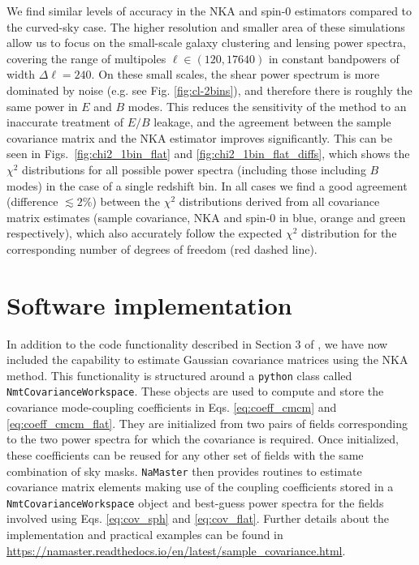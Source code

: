 \documentclass[a4paper,11pt]{article}
\begin{document}
    We find similar levels of accuracy in the NKA and spin-0 estimators
    compared to the curved-sky case. The higher resolution and smaller area of
    these simulations allow us to focus on the small-scale galaxy clustering
    and lensing power spectra, covering the range of multipoles
    $\ell\in(120,17640)$ in constant bandpowers of width $\Delta \ell=240$. On
    these small scales, the shear power spectrum is more dominated by noise
    (e.g. see Fig. \ref{fig:cl-2bins}), and therefore there is roughly the
    same power in $E$ and $B$ modes. This reduces the sensitivity of the
    method to an inaccurate treatment of $E/B$ leakage, and the agreement
    between the sample covariance matrix and the NKA estimator improves
    significantly. This can be seen in Figs.~\ref{fig:chi2_1bin_flat} and
    \ref{fig:chi2_1bin_flat_diffs}, which
    shows the $\chi^2$ distributions for all possible power spectra (including
    those including $B$ modes) in the case of a single redshift bin. In all
    cases we find a good agreement (difference $\lesssim 2 \%$) between the
    $\chi^2$ distributions derived from all covariance matrix estimates
    (sample covariance, NKA and spin-0 in blue, orange and green
    respectively), which also accurately follow the expected $\chi^2$
    distribution for the corresponding number of degrees of freedom (red
    dashed line).     
  \section{Software implementation}\label{app:namaster}
    In addition to the code functionality described in Section 3 of \cite{2019MNRAS.484.4127A}, we have now included the capability to estimate Gaussian covariance matrices using the NKA method. This functionality is structured around a {\tt python} class called {\tt NmtCovarianceWorkspace}. These objects are used to compute and store the covariance mode-coupling coefficients in Eqs. \ref{eq:coeff_cmcm} and \ref{eq:coeff_cmcm_flat}. They are initialized from two pairs of fields corresponding to the two power spectra for which the covariance is required. Once initialized, these coefficients can be reused for any other set of fields with the same combination of sky masks. {\tt NaMaster} then provides routines to estimate covariance matrix elements making use of the coupling coefficients stored in a {\tt NmtCovarianceWorkspace} object and best-guess power spectra for the fields involved using Eqs. \ref{eq:cov_sph} and \ref{eq:cov_flat}. Further details about the implementation and practical examples can be found in \url{https://namaster.readthedocs.io/en/latest/sample_covariance.html}.

  
  
\end{document}
